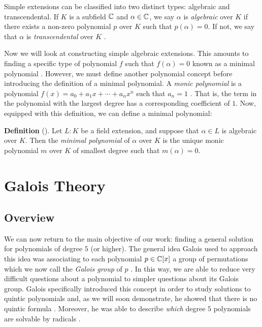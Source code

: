 \documentclass[11pt, a4paper, oneside]{article}
\theoremstyle{plain}
\theoremstyle{plain}
\theoremstyle{plain}
\theoremstyle{plain}
\theoremstyle{definition}
\theoremstyle{example}
\begin{document}
{Simple extensions can be classified into two distinct types: algebraic and transcendental. If $K$ is a subfield $\mathbb{C}$ and $\alpha \in \mathbb{C}$, we say $\alpha$ is \textit{algebraic} over $K$ if there exists a non-zero polynomial $p$ over $K$ such that $p(\alpha) = 0$. If not, we say that $\alpha$ is \textit{transcendental} over $K$ \cite[\S 5.1, p. 71]{stewart}.

\par
Now we will look at constructing simple algebraic extensions. This amounts to finding a specific type of polynomial $f$ such that $f(\alpha) = 0$ known as a minimal polynomial \cite[\S 5.2]{stewart}. However, we must define another polynomial concept before introducing the definition of a minimal polynomial. A \textit{monic polynomial} is a polynomial $f(x) = a_0 + a_1x + \cdots + a_nx^n$ such that $a_n = 1$ \cite[\S 5.2]{stewart}. That is, the term in the polynomial with the largest degree has a corresponding coefficient of $1$. Now, equipped with this definition, we can define a minimal polynomial:

\textbf{Definition} (\cite[Definition 5.5]{stewart}). Let $L : K$ be a field extension, and suppose that $\alpha \in L$ is algebraic over $K$. Then the \textit{minimal polynomial} of $\alpha$ over $K$ is the unique monic polynomial $m$ over $K$ of smallest degree such that $m(\alpha) = 0$.



\section{Galois Theory}

\subsection{Overview}

We can now return to the main objective of our work: finding a general solution for polynomials of degree $5$ (or higher). The general idea Galois used to approach this idea was associating to each polynomial $p \in \mathbb{C}[x]$ a group of permutations which we now call the \textit{Galois group} of $p$ \cite[\S 8, p. 107]{stewart}. In this way, we are able to reduce very difficult questions about a polynomial to simpler questions about its Galois group. Galois specifically introduced this concept in order to study solutions to quintic polynomials and, as we will soon demonstrate, he showed that there is no quintic formula \cite{galoiswiki}. Moreover, he was able to describe \textit{which} degree $5$ polynomials are solvable by radicals \cite{galoiswiki}.

}
\end{document}
